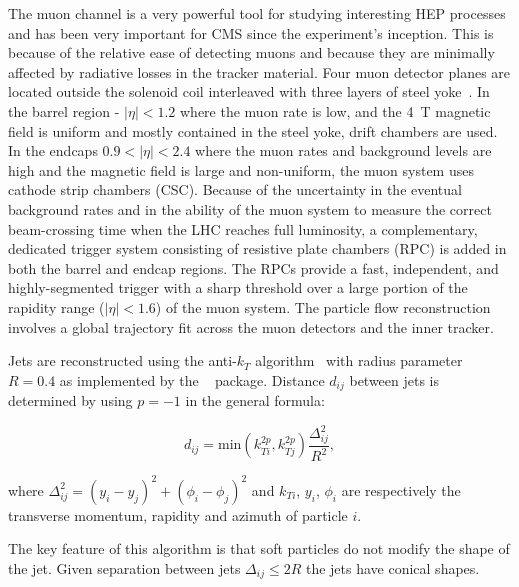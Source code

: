 The muon channel is a very powerful tool for studying interesting HEP processes and has been very important for CMS since the experiment's inception. This is because of the relative ease of detecting muons and because they are minimally affected by radiative losses in the tracker material. Four muon detector planes are located outside the solenoid coil interleaved with three layers of steel yoke~\cite{muon_tech_rep}. In the barrel region - $\left|\eta\right|<1.2$ where the muon rate is low, and the 4~T magnetic field is uniform and mostly contained in the steel yoke, drift chambers are used. In the endcaps $0.9<\left|\eta\right|<2.4$ where the muon rates and background levels are high and the magnetic field is large and non-uniform, the muon system uses cathode strip chambers (CSC). Because of the uncertainty in the eventual background rates and in the ability of the muon system to measure the correct beam-crossing time when the LHC reaches full luminosity, a complementary, dedicated trigger system consisting of resistive plate chambers (RPC) is added in both the barrel and endcap regions. The RPCs provide a fast, independent, and highly-segmented trigger with a sharp \pt threshold over a large portion of the rapidity range ($\left|\eta\right|<1.6$) of the muon system. The particle flow reconstruction involves a global trajectory fit across the muon detectors and the inner tracker. 

Jets are reconstructed using the anti-$k_{T}$ algorithm~\cite{Cacciari:2008gp} with radius parameter $R=0.4$ as implemented by the \FASTJET~\cite{Cacciari:2011ma} package. Distance $d_{ij}$ between jets is determined by using $p=-1$ in the general formula:

\begin{equation}
d_{ij}=\text{min}(k_{Ti}^{2p}, k_{Tj}^{2p})\frac{\Delta_{ij}^{2}}{R^{2}},
\end{equation}

where $\Delta_{ij}^{2}=(y_{i}-y_{j})^{2}+(\phi_{i}-\phi_{j})^{2}$ and $k_{Ti}$, $y_{i}$, $\phi_{i}$ are respectively the transverse momentum, rapidity and azimuth of particle $i$. 

The key feature of this algorithm is that soft particles do not modify the shape of the jet. Given separation between jets $\Delta_{ij}\leq2R$ the jets have conical shapes. 
